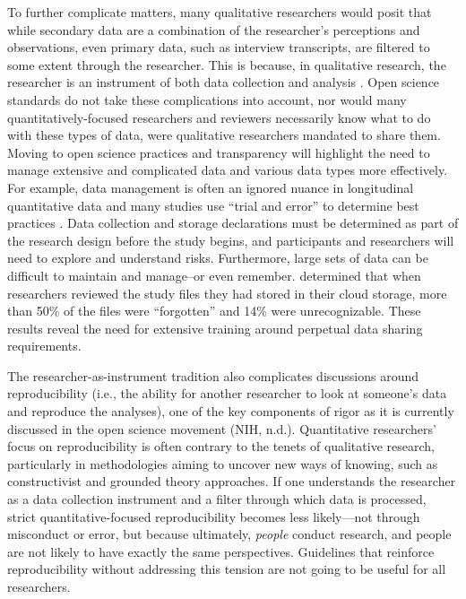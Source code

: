 \documentclass[authordate, meta]{jote-new-article}
\begin{document}
To further complicate matters, many qualitative researchers would posit that while secondary data are a combination of the researcher’s perceptions and observations, even primary data, such as interview transcripts, are filtered to some extent through the researcher. This is because, in qualitative research, the researcher is an instrument of both data collection and analysis \parencites[e.g.,][]{Peredaryenko2013}. Open science standards do not take these complications into account, nor would many quantitatively-focused researchers and reviewers necessarily know what to do with these types of data, were qualitative researchers mandated to share them. Moving to open science practices and transparency will highlight the need to manage extensive and complicated data and various data types more effectively. For example, data management is often an ignored nuance in longitudinal quantitative data and many studies use “trial and error” to determine best practices \parencites{Youngblut1990}. Data collection and storage declarations must be determined as part of the research design before the study begins, and participants and researchers will need to explore and understand risks. Furthermore, large sets of data can be difficult to maintain and manage–or even remember. \textcite{Khan2018} determined that when researchers reviewed the study files they had stored in their cloud storage, more than 50\% of the files were “forgotten” and 14\% were unrecognizable. These results reveal the need for extensive training around perpetual data sharing requirements.



The researcher-as-instrument tradition also complicates discussions around reproducibility (i.e., the ability for another researcher to look at someone’s data and reproduce the analyses), one of the key components of rigor as it is currently discussed in the open science movement (NIH, n.d.). Quantitative researchers’ focus on reproducibility is often contrary to the tenets of qualitative research, particularly in methodologies aiming to uncover new ways of knowing, such as constructivist and grounded theory approaches. If one understands the researcher as a data collection instrument and a filter through which data is processed, strict quantitative-focused reproducibility becomes less likely—not through misconduct or error, but because ultimately, \emph{people }conduct research, and people are not likely to have exactly the same perspectives. Guidelines that reinforce reproducibility without addressing this tension are not going to be useful for all researchers.
\end{document}
